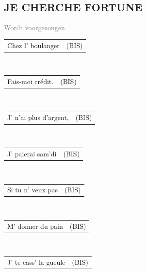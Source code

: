 \documentclass{article}
\newcommand{\spacing}{2mm}
\begin{document}
\subsection*{JE CHERCHE FORTUNE}
\textcolor{gray}{\small Wordt voorgezongen}
\par
\renewcommand{\spacing}{1mm}
\flushleft
\begin{tabularx}{0.8\textwidth}{>{\raggedright\arraybackslash}X | c}
    Chez l’ boulanger & (BIS)\\
\end{tabularx}\\
\vspace{\spacing}
\begin{tabularx}{0.8\textwidth}{>{\raggedright\arraybackslash}X | c}
    Fais-moi crédit. & (BIS)\\
\end{tabularx}\\
\vspace{\spacing}
\begin{tabularx}{0.8\textwidth}{>{\raggedright\arraybackslash}X | c}
    J’ n’ai plus d’argent, & (BIS)\\
\end{tabularx}\\
\vspace{\spacing}
\begin{tabularx}{0.8\textwidth}{>{\raggedright\arraybackslash}X | c}
    J’ paierai sam’di & (BIS)\\
\end{tabularx}\\
\vspace{\spacing}
\begin{tabularx}{0.8\textwidth}{>{\raggedright\arraybackslash}X | c}
    Si tu n’ veux pas & (BIS)\\
\end{tabularx}\\
\vspace{\spacing}
\begin{tabularx}{0.8\textwidth}{>{\raggedright\arraybackslash}X | c}
    M’ donner du pain & (BIS)\\
\end{tabularx}\\
\vspace{\spacing}
\begin{tabularx}{0.8\textwidth}{>{\raggedright\arraybackslash}X | c}
    J’ te cass’ la gueule & (BIS)\\
\end{tabularx}\\
\end{document}
